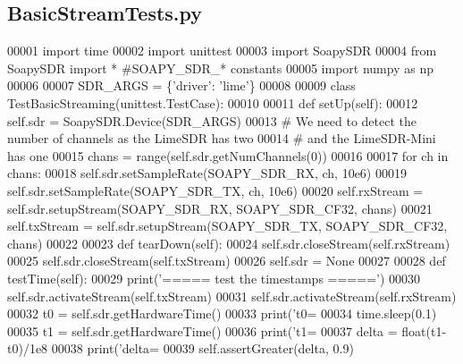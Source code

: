 \subsection{Basic\+Stream\+Tests.\+py}
\label{BasicStreamTests_8py_source}

\begin{DoxyCode}
00001 \textcolor{keyword}{import} time
00002 \textcolor{keyword}{import} unittest
00003 \textcolor{keyword}{import} SoapySDR
00004 \textcolor{keyword}{from} SoapySDR \textcolor{keyword}{import} * \textcolor{comment}{#SOAPY\_SDR\_* constants}
00005 \textcolor{keyword}{import} numpy \textcolor{keyword}{as} np
00006 
00007 SDR\_ARGS = \{\textcolor{stringliteral}{'driver'}: \textcolor{stringliteral}{'lime'}\}
00008 
00009 \textcolor{keyword}{class }TestBasicStreaming(unittest.TestCase):
00010 
00011     \textcolor{keyword}{def }setUp(self):
00012         self.sdr = SoapySDR.Device(SDR\_ARGS)
00013         \textcolor{comment}{# We need to detect the number of channels as the LimeSDR has two}
00014         \textcolor{comment}{# and the LimeSDR-Mini has one}
00015         chans = range(self.sdr.getNumChannels(0))
00016 
00017         \textcolor{keywordflow}{for} ch \textcolor{keywordflow}{in} chans:
00018             self.sdr.setSampleRate(SOAPY\_SDR\_RX, ch, 10e6)
00019             self.sdr.setSampleRate(SOAPY\_SDR\_TX, ch, 10e6)
00020         self.rxStream = self.sdr.setupStream(SOAPY\_SDR\_RX, SOAPY\_SDR\_CF32, chans)
00021         self.txStream = self.sdr.setupStream(SOAPY\_SDR\_TX, SOAPY\_SDR\_CF32, chans)
00022 
00023     \textcolor{keyword}{def }tearDown(self):
00024         self.sdr.closeStream(self.rxStream)
00025         self.sdr.closeStream(self.txStream)
00026         self.sdr = \textcolor{keywordtype}{None}
00027 
00028     \textcolor{keyword}{def }testTime(self):
00029         print(\textcolor{stringliteral}{'===== test the timestamps ====='})
00030         self.sdr.activateStream(self.txStream)
00031         self.sdr.activateStream(self.rxStream)
00032         t0 = self.sdr.getHardwareTime()
00033         print(\textcolor{stringliteral}{'t0=%
00034         time.sleep(0.1)
00035         t1 = self.sdr.getHardwareTime()
00036         print(\textcolor{stringliteral}{'t1=%
00037         delta = float(t1-t0)/1e8
00038         print(\textcolor{stringliteral}{'delta=%
00039         self.assertGreater(delta, 0.9)
}}}
\end{DoxyCode}
